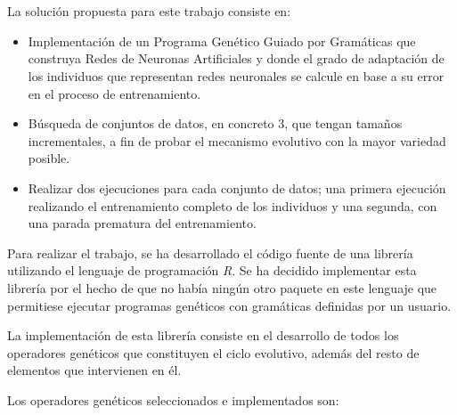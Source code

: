 \documentclass[spanish,a4paper,12pt,twoside]{report}
\begin{document}
  \chapter{\vspace{-3cm}{\LARGE 6. Solución propuesta}}
  \setcounter{figure}{16}
  \vspace{-1cm}
  La solución propuesta para este trabajo consiste en: \par
  \begin{itemize}
    \item Implementación de un Programa Genético Guiado por Gramáticas que construya Redes de Neuronas Artificiales y donde el grado de adaptación de los individuos que representan redes neuronales se calcule en base a su error en el proceso de entrenamiento.
    \item Búsqueda de conjuntos de datos, en concreto 3, que tengan tamaños incrementales, a fin de probar el mecanismo evolutivo con la mayor variedad posible.
    \item Realizar dos ejecuciones para cada conjunto de datos; una primera ejecución realizando el entrenamiento completo de los individuos y una segunda, con una parada prematura del entrenamiento.
  \end{itemize} \par
  Para realizar el trabajo, se ha desarrollado el código fuente de una librería utilizando el lenguaje de programación \emph{R}. Se ha decidido implementar esta librería por el hecho de que no había ningún otro paquete en este lenguaje que permitiese ejecutar programas genéticos con gramáticas definidas por un usuario. \par
  La implementación de esta librería consiste en el desarrollo de todos los operadores genéticos que constituyen el ciclo evolutivo, además del resto de elementos que intervienen en él.  \par
  Los operadores genéticos seleccionados e implementados son:
\end{document}
